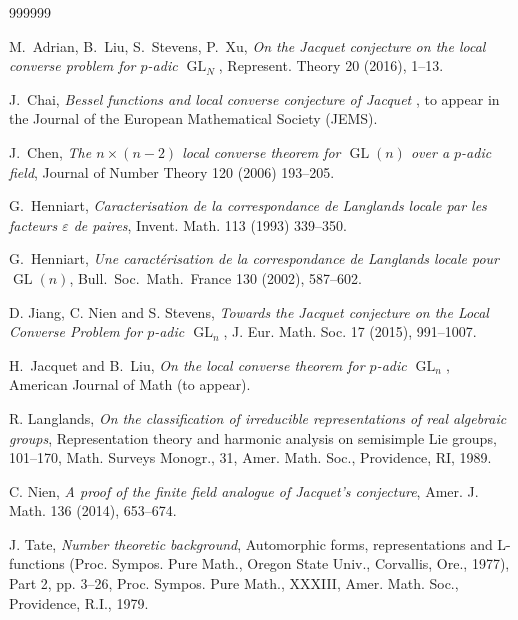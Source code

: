 \documentclass[11pt]{amsart}
\theoremstyle{plain}
\theoremstyle{definition}
\numberwithin{equation}{section}
\newcommand{\GL}{\operatorname{GL}}
\begin{document}
\begin{thebibliography}{999999}


M.\ Adrian, B.\ Liu, S.\ Stevens, P.\ Xu, {\it On the Jacquet
conjecture on the local converse problem for $p$-adic
$\GL_N$}, Represent. Theory 20 (2016), 1--13. 

J.\ Chai, {\it  Bessel functions and local converse conjecture of
  Jacquet }, to appear in the Journal of the European Mathematical
Society (JEMS).


J.\ Chen, {\it The $n\times(n-2)$ local converse theorem for $\GL(n)$
  over a $p$-adic field}, Journal of Number Theory 120 (2006) 193--205.

G.\ Henniart, {\it Caracterisation de la correspondance de Langlands
  locale par les facteurs $\varepsilon$ de paires}, Invent. Math. 113
(1993) 339--350.

G.\ Henniart, {\it Une caractérisation de la correspondance de
  Langlands locale pour $\GL(n)$}, Bull.\ Soc.\ Math.\ France 130
(2002), 587--602.

 D. Jiang, C. Nien and S. Stevens, {\it Towards the Jacquet conjecture on the
Local Converse Problem for $p$-adic $\GL_n$}, J. Eur. Math. Soc. 17 (2015), 991--1007.

H.\ Jacquet and B.\ Liu, {\it On the local converse theorem for
  $p$-adic $\GL_n$}, American Journal of Math (to appear).

R. Langlands, {\it On the classification of irreducible
  representations of real algebraic groups}, Representation theory and
harmonic analysis on semisimple Lie groups, 101--170, Math. Surveys
Monogr., 31, Amer. Math. Soc., Providence, RI, 1989.

 C. Nien, {\it A proof of the finite field analogue of Jacquet’s conjecture}, Amer. J.
Math. 136 (2014), 653--674.

J. Tate, {\it Number theoretic background}, Automorphic forms,
representations and L-functions (Proc. Sympos. Pure Math., Oregon
State Univ., Corvallis, Ore., 1977), Part 2, pp. 3--26,
Proc. Sympos. Pure Math., XXXIII, Amer. Math. Soc., Providence, R.I.,
1979.


\end{thebibliography}
\end{document}
